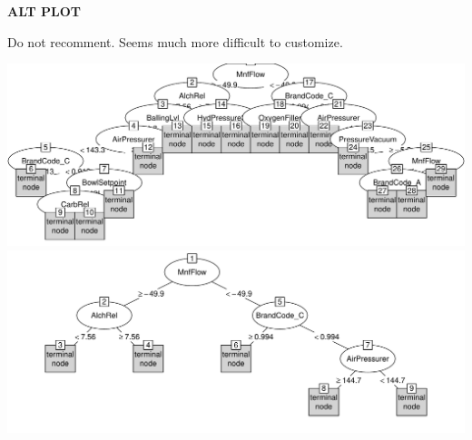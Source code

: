 \documentclass[]{report}
\begin{document}
\textbf{ALT PLOT}

Do not recomment. Seems much more difficult to customize.

\includegraphics{Group2_Project2_Fall2019_files/figure-latex/unnamed-chunk-6-1.pdf}
\includegraphics{Group2_Project2_Fall2019_files/figure-latex/unnamed-chunk-6-2.pdf}
\end{document}

